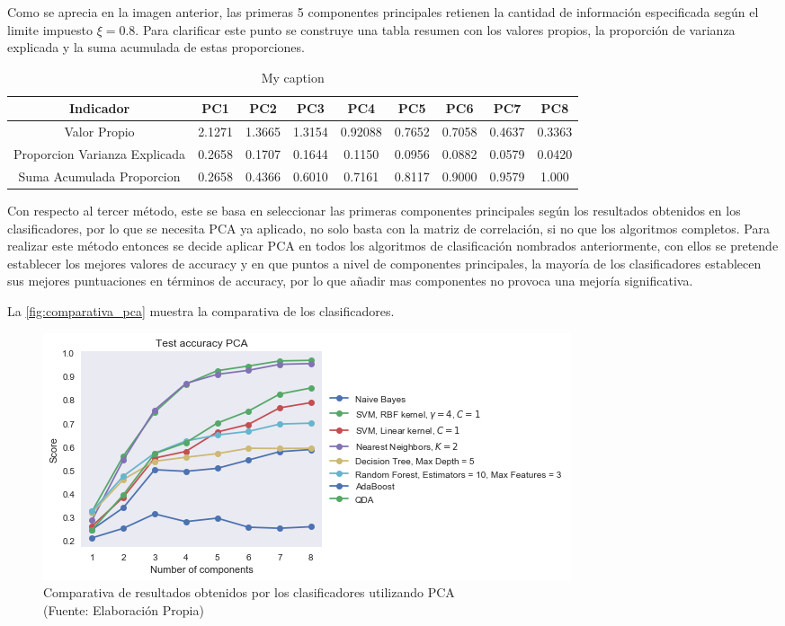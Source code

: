 Como se aprecia en la imagen anterior, las primeras 5 componentes principales retienen la cantidad de información especificada según el limite impuesto $\xi =0.8$. Para clarificar este punto se construye una tabla resumen con los valores propios, la proporción de varianza explicada y la suma acumulada de estas proporciones.

\begin{table}[]
\centering
\caption{My caption}
\label{my-label}
\begin{tabular}{|c|c|c|c|c|c|c|c|c|}
\hline
Indicador                     & PC1    & PC2    & PC3    & PC4     & PC5    & PC6    & PC7    & PC8    \\ \hline
Valor Propio                  & 2.1271 & 1.3665 & 1.3154 & 0.92088 & 0.7652 & 0.7058 & 0.4637 & 0.3363 \\ \hline
Proporcion Varianza Explicada & 0.2658 & 0.1707 & 0.1644 & 0.1150  & 0.0956 & 0.0882 & 0.0579 & 0.0420 \\ \hline
Suma Acumulada Proporcion     & 0.2658 & 0.4366 & 0.6010 & 0.7161  & 0.8117 & 0.9000 & 0.9579 & 1.000  \\ \hline
\end{tabular}
\end{table}

Con respecto al tercer método, este se basa en seleccionar las primeras componentes principales según los resultados obtenidos en los clasificadores, por lo que se necesita PCA ya aplicado, no solo basta con la matriz de correlación, si no que los algoritmos completos. Para realizar este método entonces se decide aplicar PCA en todos los algoritmos de clasificación nombrados anteriormente, con ellos se pretende establecer los mejores valores de accuracy y en que puntos a nivel de componentes principales, la mayoría de los clasificadores establecen sus mejores puntuaciones en términos de accuracy, por lo que añadir mas componentes no provoca una mejoría significativa.

La \autoref{fig:comparativa_pca} muestra la comparativa de los clasificadores.

\begin{figure}[ht!]
\centering
\includegraphics[width=.6\textwidth]{figures/comparativa_clasificadores_pca.png}
\caption[abs]{Comparativa de resultados obtenidos por los clasificadores utilizando PCA  \\
{\scriptsize (Fuente: Elaboración Propia)}}
\label{fig:comparativa_pca}
\end{figure}

